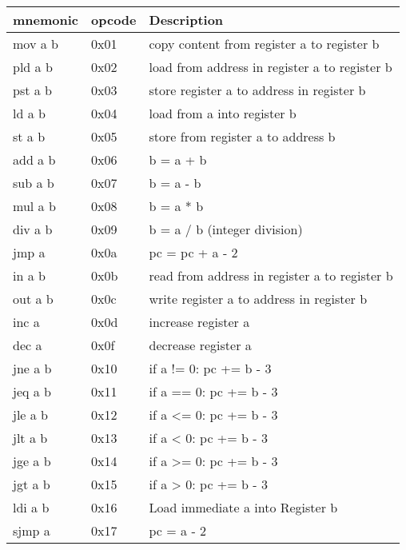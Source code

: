 \documentclass[letterpaper,10pt,english]{sphinxmanual}
\begin{document}
\begin{tabulary}{\linewidth}{|L|L|L|}
\hline
\textsf{\relax 
mnemonic
} & \textsf{\relax 
opcode
} & \textsf{\relax 
Description
}\\
\hline
mov a b
 & 
0x01
 & 
copy content from register a to register b \protect\footnotemark[1]
\\
\hline
pld a b
 & 
0x02
 & 
load from address in register a to register b \protect\footnotemark[1]
\\
\hline
pst a b
 & 
0x03
 & 
store register a to address in register b \protect\footnotemark[1]
\\
\hline
ld  a b
 & 
0x04
 & 
load from a into register b \protect\footnotemark[1]
\\
\hline
st  a b
 & 
0x05
 & 
store from register a to address b \protect\footnotemark[1]
\\
\hline
add a b
 & 
0x06
 & 
b = a + b
\\
\hline
sub a b
 & 
0x07
 & 
b = a - b
\\
\hline
mul a b
 & 
0x08
 & 
b = a * b
\\
\hline
div a b
 & 
0x09
 & 
b = a / b (integer division)
\\
\hline
jmp a
 & 
0x0a
 & 
pc = pc + a - 2 \protect\footnotemark[3]
\\
\hline
in a b
 & 
0x0b
 & 
read from address in register a to register b \protect\footnotemark[2]
\\
\hline
out a b
 & 
0x0c
 & 
write register a to address in register b \protect\footnotemark[2]
\\
\hline
inc a
 & 
0x0d
 & 
increase register a
\\
\hline
dec a
 & 
0x0f
 & 
decrease register a
\\
\hline
jne a b
 & 
0x10
 & 
if a != 0: pc += b - 3
\\
\hline
jeq a b
 & 
0x11
 & 
if a == 0: pc += b - 3
\\
\hline
jle a b
 & 
0x12
 & 
if a \textless{}= 0: pc += b - 3
\\
\hline
jlt a b
 & 
0x13
 & 
if a \textless{} 0: pc += b - 3
\\
\hline
jge a b
 & 
0x14
 & 
if a \textgreater{}= 0: pc += b - 3
\\
\hline
jgt a b
 & 
0x15
 & 
if a \textgreater{} 0: pc += b - 3
\\
\hline
ldi a b
 & 
0x16
 & 
Load immediate a into Register b
\\
\hline
sjmp a
 & 
0x17
 & 
pc = a - 2 \protect\footnotemark[3]
\\
\hline\end{tabulary}
\end{document}
